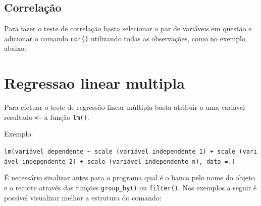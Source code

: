\documentclass[
  brazil,
]{book}
\newenvironment{Shaded}{\begin{snugshade}}{\end{snugshade}}
\newcommand{\CommentTok}[1]{\textcolor[rgb]{0.56,0.35,0.01}{\textit{#1}}}
\newcommand{\DataTypeTok}[1]{\textcolor[rgb]{0.13,0.29,0.53}{#1}}
\newcommand{\KeywordTok}[1]{\textcolor[rgb]{0.13,0.29,0.53}{\textbf{#1}}}
\newcommand{\NormalTok}[1]{#1}
\newcommand{\OperatorTok}[1]{\textcolor[rgb]{0.81,0.36,0.00}{\textbf{#1}}}
\newcommand{\StringTok}[1]{\textcolor[rgb]{0.31,0.60,0.02}{#1}}
\begin{document}
\hypertarget{correlauxe7uxe3o}{%
\subsection{Correlação}\label{correlauxe7uxe3o}}

Para fazer o teste de correlação basta selecionar o par de variáveis em questão e adicionar o comando \texttt{cor()} utilizando todas as observações, como no exemplo abaixo:

\begin{Shaded}
\end{Shaded}

\hypertarget{regressao-linear-multipla}{%
\section{Regressao linear multipla}\label{regressao-linear-multipla}}

Para efetuar o teste de regressão linear múltipla basta atribuir a uma variável resultado \texttt{\textless{}-} a função \texttt{lm()}.

Exemplo:

\texttt{lm(variável\ dependente\ \textasciitilde{}\ scale\ (variável\ independente\ 1)\ +\ scale\ (variável\ independente\ 2)\ +\ scale\ (variável\ independente\ n),\ data\ =.)}

É necessário sinalizar antes para o programa qual é o banco pelo nome do objeto e o recorte através das funções \texttt{group\_by()} ou \texttt{filter()}. Nos exemplos a seguir é possível visualizar melhor a estrutura do comando:
\end{document}
